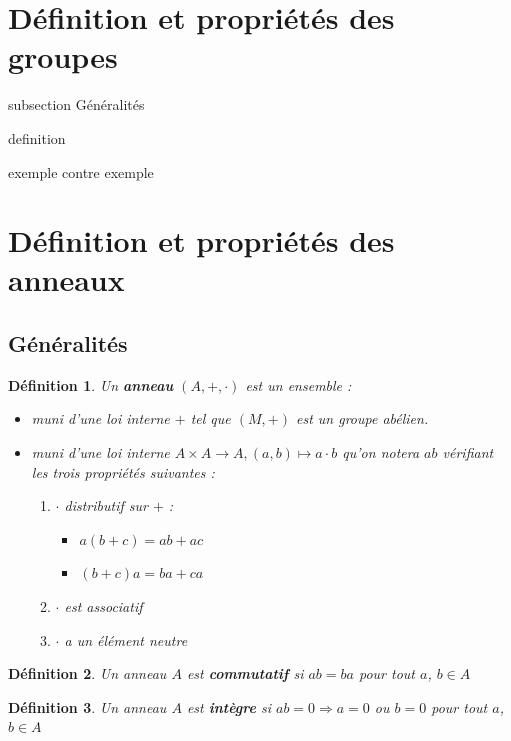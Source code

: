 \documentclass[a4paper,12pt]{report}  %
\theoremstyle{definitionstyle}
\newtheorem{definition}{Définition}[chapter] %
\theoremstyle{examplestyle}
\theoremstyle{remarkstyle}
\theoremstyle{propositionstyle}
\theoremstyle{theoremstyle}
\theoremstyle{proofstyle}
\begin{document}
	\section{Définition et propriétés des groupes}
	
	
	subsection Généralités
	
	definition
	
	exemple contre exemple
	
	
	\section{Définition et propriétés des anneaux}
	
	\subsection{Généralités}
	
	\begin{definition}
		Un \textbf{anneau} $(A, +, \cdot)$ est un ensemble : 
		\begin{itemize}
			\item muni d'une loi interne $+$ tel que $(M, +)$ est un groupe abélien.
			\item muni d'une loi interne $A \times A \rightarrow A, (a, b) \mapsto a \cdot b$ qu'on notera $ab$ vérifiant les trois propriétés suivantes :
			
			\begin{enumerate}
				\item $\cdot$ distributif sur $+$ :
					\begin{itemize}
						\item $a(b + c) = ab + ac$
						\item $(b+c)a = ba+ca$
					\end{itemize}
				
				
				\item $\cdot$ est associatif
				
				\item $\cdot$ a un élément neutre
			\end{enumerate}
		\end{itemize}
	\end{definition}

	\begin{definition}
		Un anneau $A$ est \textbf{commutatif} si $ab = ba$ pour tout $a$, $b \in A$
	\end{definition}
	
	\begin{definition}
		Un anneau $A$ est \textbf{intègre} si $ab=0 \Rightarrow a = 0$ ou $b = 0$ pour tout $a$, $b \in A$
	\end{definition}
\end{document}

